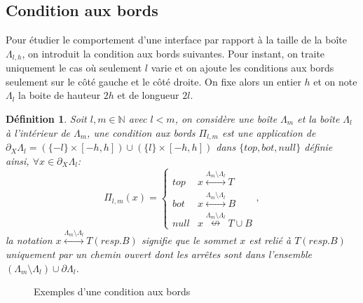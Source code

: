 \documentclass[titlepage,a4paper,11pt]{article}
\newcounter{def}
\newcounter{cor}
\newtheorem{cdb}[def]{Définition}
\newcommand{\connect}{\leftrightarrow}
\newcommand{\nconnect}{\nleftrightarrow}
\begin{document}
\subsection{Condition aux bords}
Pour étudier le comportement d'une interface par rapport à la taille de la boîte $\Lambda_{l,h}$, on introduit la condition aux bords suivantes. Pour instant, on traite uniquement le cas où seulement $l$ varie et on ajoute les conditions aux bords seulement sur le côté gauche et le côté droite. On fixe alors un entier $h$ et on note $\Lambda_l$ la boite de hauteur $2h$ et de longueur $2l$.
\begin{cdb}Soit $l,m\in \mathbb{N}$ avec $l<m$, on considère une boîte $\Lambda_m$ et la boîte $\Lambda_l$ à l'intérieur de $\Lambda_m$, une condition aux bords $\Pi_{l,m}$ est une application de $\partial_{X}\Lambda_{l} =(\{-l\}\times[-h,h]) \cup (\{l\}\times [-h,h])$ dans $\{top,bot,null\}$ définie ainsi, $\forall x\in \partial_X\Lambda_{l}$:
$$\Pi_{l,m}(x)=\left\lbrace \begin{array}{cc}
top & x\overset{\Lambda_m \setminus \Lambda_l}{\connect} T\\
bot & x\overset{\Lambda_m \setminus \Lambda_l}{\connect} B\\
null & x\overset{\Lambda_m \setminus \Lambda_l}{\nconnect} T\cup B 
\end{array} \right.,
$$
la notation $x\overset{\Lambda_m \setminus \Lambda_l}{\connect} T(resp. B)$ signifie que le sommet $x$ est relié à $T(resp. B)$ uniquement par un chemin ouvert dont les arrêtes sont dans l'ensemble $(\Lambda_m \setminus \Lambda_l) \cup \partial \Lambda_l$.
\end{cdb}
\begin{figure}[h]
\center
{}
\caption{Exemples d'une condition aux bords}
\end{figure}
\end{document}
